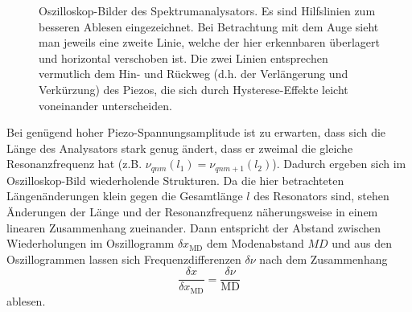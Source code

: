 \documentclass{article}
\newcommand{\mr}{\mathrm}
\begin{document}
\begin{figure}[h]
\begin{subfigure}{0.49\textwidth}
    \label{fig:analysator-lang}
  \end{subfigure}
  \caption{
    Oszilloskop-Bilder des Spektrumanalysators. Es sind Hilfslinien zum besseren Ablesen eingezeichnet.
    Bei Betrachtung mit dem Auge sieht man jeweils eine zweite Linie,
    welche der hier erkennbaren überlagert und horizontal verschoben ist.
    Die zwei Linien entsprechen vermutlich dem Hin- und Rückweg (d.h. der Verlängerung und Verkürzung) des Piezos, die sich
    durch Hysterese-Effekte leicht voneinander unterscheiden.}
  \label{fig:analysator}
\end{figure}
Bei genügend hoher Piezo-Spannungsamplitude ist zu erwarten, dass sich die Länge des Analysators stark genug ändert,
dass er zweimal die gleiche Resonanzfrequenz hat (z.B. $\nu_{qnm}(l_1) = \nu_{qnm+1}(l_2)$).
Dadurch ergeben sich im Oszilloskop-Bild wiederholende Strukturen. Da die hier betrachteten Längenänderungen klein
gegen die Gesamtlänge $l$ des Resonators sind, stehen Änderungen der Länge und der Resonanzfrequenz näherungsweise
in einem linearen Zusammenhang zueinander. Dann entspricht der Abstand zwischen Wiederholungen im Oszillogramm $\delta x_\mr{MD}$
dem Modenabstand $MD$ und aus den Oszillogrammen lassen sich Frequenzdifferenzen $\delta\nu$ nach dem Zusammenhang
\begin{equation}
  \frac{\delta x}{\delta x_\mr{MD}} = \frac{\delta \nu}{\mr{MD}} \label{eq:analyser-md-ratio}
\end{equation}
ablesen.
\end{document}
